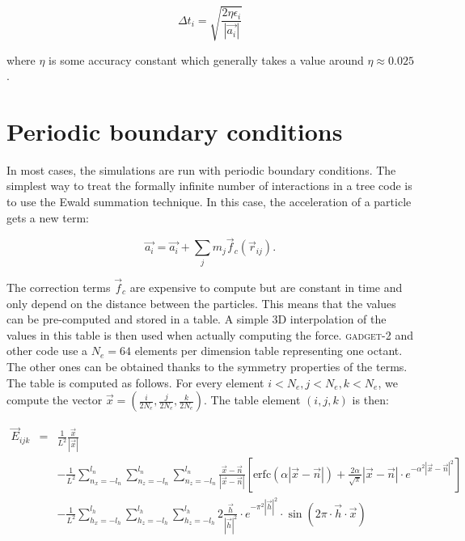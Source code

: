 \documentclass[a4paper,10pt]{report}
\newcommand{\gadget}{\textsc{gadget-2 }}
\begin{document}
\begin{equation}
 \Delta t_i = \sqrt{\frac{2\eta \epsilon_i}{|\vec{a_i}|}}
\end{equation}

where $\eta$ is some accuracy constant which generally takes a value around $\eta \approx 0.025$.

\section{Periodic boundary conditions}

In most cases, the simulations are run with periodic boundary conditions. The simplest way to treat the formally
infinite number of interactions in a tree code is to use the Ewald summation technique. In this case, the acceleration
of a particle gets a new term:

\begin{equation}
 \vec{a_i} = \vec{a_i} + \sum_j m_j \vec{f}_c(\vec{r}_{ij}).
\end{equation}

The correction terms $\vec{f}_c$ are expensive to compute but are constant in time and only depend on the distance
between the particles. This means that the values can be pre-computed and stored in a table. A simple 3D interpolation
of the values in this table is then used when actually computing the force. \gadget and other code use a $N_e=64$
elements per dimension table representing one octant. The other ones can be obtained thanks to the symmetry properties
of the terms. \\

The table is computed as follows. For every element $i <N_e, j<N_e,k<N_e$, we compute the vector $\vec{x} =
(\frac{i}{2N_e}, \frac{j}{2N_e}, \frac{k}{2N_e})$. The table element $(i,j,k)$ is then:

\begin{eqnarray*}
 \vec{E}_{ijk} &=& \frac{1}{L^2}\frac{\vec{x}}{|\vec{x}|} \\
         & & -\frac{1}{L^2}\sum_{n_x=-l_n}^{l_n}\sum_{n_z=-l_n}^{l_n}\sum_{n_z=-l_n}^{l_n}
\frac{\vec{x}-\vec{n}}{|\vec{x}-\vec{n}|}\left[\mathrm{erfc}\left(\alpha|\vec{x}-\vec{n}|\right) +
\frac{2\alpha}{\sqrt{\pi}}|\vec{x}-\vec{n}|\cdot e^{-\alpha^2|\vec{x}-\vec{n}|^2}\right]\\
         & & -\frac{1}{L^2}\sum_{h_x=-l_h}^{l_h}\sum_{h_z=-l_h}^{l_h}\sum_{h_z=-l_h}^{l_h} 2\frac{\vec{h}}{|\vec{h}|^2}
\cdot e^{-\pi^2|\vec{h}|^2} \cdot \sin\left(2\pi\cdot \vec{h}\cdot\vec{x}\right)
\end{eqnarray*}
\end{document}
